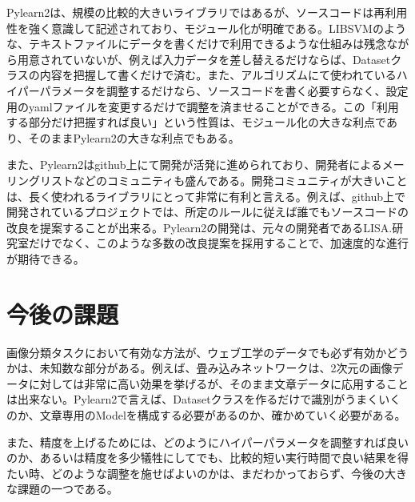 Pylearn2は、規模の比較的大きいライブラリではあるが、ソースコードは再利用性を強く意識して記述されており、モジュール化が明確である。LIBSVMのような、テキストファイルにデータを書くだけで利用できるような仕組みは残念ながら用意されていないが、例えば入力データを差し替えるだけならば、Datasetクラスの内容を把握して書くだけで済む。また、アルゴリズムにて使われているハイパーパラメータを調整するだけなら、ソースコードを書く必要すらなく、設定用のyamlファイルを変更するだけで調整を済ませることができる。この「利用する部分だけ把握すれば良い」という性質は、モジュール化の大きな利点であり、そのままPylearn2の大きな利点でもある。\par
また、Pylearn2はgithub上にて開発が活発に進められており、開発者によるメーリングリストなどのコミュニティも盛んである。開発コミュニティが大きいことは、長く使われるライブラリにとって非常に有利と言える。例えば、github上で開発されているプロジェクトでは、所定のルールに従えば誰でもソースコードの改良を提案することが出来る。Pylearn2の開発は、元々の開発者であるLISA.研究室だけでなく、このような多数の改良提案を採用することで、加速度的な進行が期待できる。

\section{今後の課題}
画像分類タスクにおいて有効な方法が、ウェブ工学のデータでも必ず有効かどうかは、未知数な部分がある。例えば、畳み込みネットワークは、2次元の画像データに対しては非常に高い効果を挙げるが、そのまま文章データに応用することは出来ない。Pylearn2で言えば、Datasetクラスを作るだけで識別がうまくいくのか、文章専用のModelを構成する必要があるのか、確かめていく必要がある。\par
また、精度を上げるためには、どのようにハイパーパラメータを調整すれば良いのか、あるいは精度を多少犠牲にしてでも、比較的短い実行時間で良い結果を得たい時、どのような調整を施せばよいのかは、まだわかっておらず、今後の大きな課題の一つである。\par

